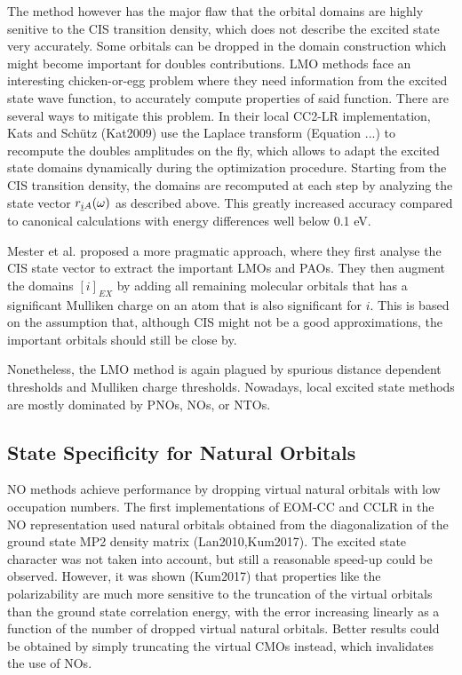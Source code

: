 The method however has the major flaw that the orbital domains are highly senitive to the CIS transition density, which does not describe the excited state very accurately. Some orbitals can be dropped in the domain construction which might become important for doubles contributions. LMO methods face an interesting chicken-or-egg problem where they need information from the excited state wave function, to accurately compute properties of said function. There are several ways to mitigate this problem. In their local CC2-LR implementation, Kats and Schütz (Kat2009) use the Laplace transform (Equation ...) to recompute the doubles amplitudes on the fly, which allows to adapt the excited state domains dynamically during the optimization procedure. Starting from the CIS transition density, the domains are recomputed at each step by analyzing the state vector $r_{\underline{i} A}(\omega)$ as described above. This greatly increased accuracy compared to canonical calculations with energy differences well below 0.1 eV.

Mester et al. proposed a more pragmatic approach, where they first analyse the CIS state vector to extract the important LMOs and PAOs. They then augment the domains $[i]_{EX}$ by adding all remaining molecular orbitals that has a significant Mulliken charge on an atom that is also significant for $i$. This is based on the assumption that, although CIS might not be a good approximations, the important orbitals should still be close by. 

Nonetheless, the LMO method is again plagued by spurious distance dependent thresholds and Mulliken charge thresholds. Nowadays, local excited state methods are mostly dominated by PNOs, NOs, or NTOs. 


\subsection{State Specificity for Natural Orbitals}

NO methods achieve performance by dropping virtual natural orbitals with low occupation numbers. The first implementations of EOM-CC and CCLR in the NO representation used natural orbitals obtained from the diagonalization of the ground state MP2 density matrix (Lan2010,Kum2017). The excited state character was not taken into account, but still a reasonable speed-up could be observed. However, it was shown (Kum2017) that properties like the polarizability are much more sensitive to the truncation of the virtual orbitals than the ground state correlation energy, with the error increasing linearly as a function of the number of dropped virtual natural orbitals. Better results could be obtained by simply truncating the virtual CMOs instead, which invalidates the use of NOs.

